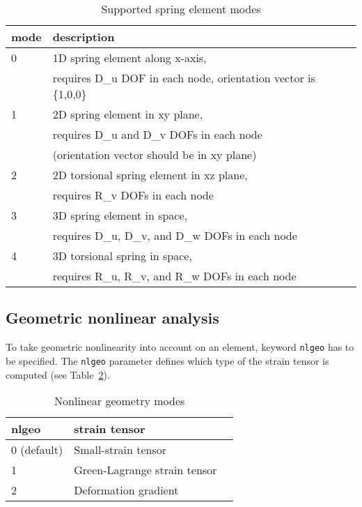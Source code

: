 \documentclass[a4paper]{article}
\newcommand{\param}[1]{\texttt{#1}} %
\begin{document}
\begin{table}
  \centering
  \begin{tabular}{lll}
    \hline
    mode & description\\
    \hline
    0 & 1D spring element along x-axis,\\
    & requires D\_u DOF in each node, orientation vector is \{1,0,0\}\\
    1 & 2D spring element in xy plane,\\
    & requires D\_u and D\_v DOFs in each node \\
    & (orientation vector should be in xy plane)\\
    2 & 2D torsional spring element in xz plane,\\
    & requires R\_v DOFs in each node\\
    3 & 3D spring element in space,\\
    & requires D\_u, D\_v, and D\_w DOFs in each node\\
    4 & 3D torsional spring in space,\\
    & requires R\_u, R\_v, and R\_w DOFs in each node\\
    \hline
  \end{tabular}
  \caption{Supported spring element modes } \label{spring_mode_table}
\end{table}

\clearpage
\subsection{Geometric nonlinear analysis}
To take geometric nonlinearity into account on an element, keyword \param{nlgeo} has to be specified. The \param{nlgeo} parameter defines which type of the strain tensor is computed (see Table~\ref{strain_tensor_table}).
\begin{table}
  \centering
  \begin{tabular}{lll}
    \hline
    nlgeo & strain tensor\\
    \hline
    0 (default) & Small-strain tensor\\
    1 & Green-Lagrange strain tensor\\
    2 & Deformation gradient\\
    \hline
  \end{tabular}
  \caption{Nonlinear geometry modes} \label{strain_tensor_table}
\end{table}
\end{document}
